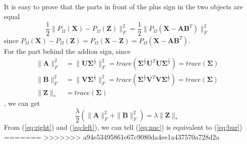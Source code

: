 \documentclass[11pt]{article}
\newcommand{\mtx}[1]{\mathbf{#1}}
\def \mA {\mtx{A}}
\def \mB {\mtx{B}}
\def \mU {\mtx{U}}
\def \mV {\mtx{V}}
\def \mSigma {\mtx{\Sigma}}
\def \mX {\mtx{X}}
\def \mZ {\mtx{Z}}
\begin{document}
\subsection{}
It is easy to prove that the parts in front of the plus sign in the two objects are equal  
\begin{equation}\label{eq:right}
	\frac{1}{2}\|P_\Omega(\mX)-P_\Omega(\mZ)\|_F^2 = \frac{1}{2}\|P_\Omega(\mX-\mA\mB^T)\|_F^2
\end{equation}
since $P_\Omega(\mX)-P_\Omega(\mZ) = P_\Omega(\mX-\mZ) =P_\Omega(\mX-\mA\mB^T)$.\\
For the part behind the addion sign, since
\begin{align*}
	\|\mA\|_F^2 &= \|\mU\mSigma^\frac{1}{2}\|_F^2 = trace(\mSigma^\frac{1}{2}\mU^T\mU\mSigma^\frac{1}{2}) = trace(\mSigma)\\
	\|\mB\|_F^2 &= \|\mV\mSigma^\frac{1}{2}\|_F^2 = trace(\mSigma^\frac{1}{2}\mV^T\mV\mSigma^\frac{1}{2}) = trace(\mSigma)\\
	\|\mZ\|_* &= trace(\mSigma)
\end{align*},
we can get \
\begin{equation}\label{eq:left}
	\frac{\lambda}{2}(\|\mA\|_F^2+\|\mB\|^2_F) = \lambda\|\mZ\|_*
\end{equation}
From (\ref{eq:right}) and (\ref{eq:left}), we can tell (\ref{eq:nuc}) is equivalent to (\ref{eq:bur})
=======
>>>>>>> a94e53495861e67c9080da4ee1a437570a728d2a
\end{document}
